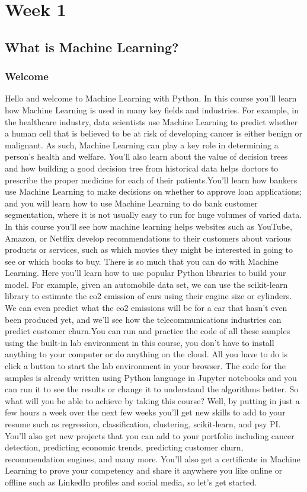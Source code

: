 \chapter{Week 1}
\section{What is Machine Learning?}
	\subsection{Welcome}
		
	Hello and welcome to Machine Learning with Python. In this course you'll learn how Machine Learning is used in many key fields and industries. For example, in the healthcare industry, data scientists use Machine Learning to predict whether a human cell that is believed to be at risk of developing cancer is either benign or malignant. As such, Machine Learning can play a key role in determining a person's health and welfare. You'll also learn about the value of decision trees and how building a good decision tree from historical data helps doctors to prescribe the proper medicine for each of their patients.You'll learn how bankers use Machine Learning to make decisions on whether to approve loan applications; and you will learn how to use Machine Learning to do bank customer segmentation, where it is not usually easy to run for huge volumes of varied data. In this course you'll see how machine learning helps websites such as YouTube, Amazon, or Netflix develop recommendations to their customers about various products or services, such as which movies they might be interested in going to see or which books to buy. There is so much that you can do with Machine Learning. Here you'll learn how to use popular Python libraries to build your model. For example, given an automobile data set, we can use the scikit-learn library to estimate the co2 emission of cars using their engine size or cylinders. We can even predict what the co2 emissions will be for a car that hasn't even been produced yet, and we'll see how the telecommunications industries can predict customer churn.You can run and practice the code of all these samples using the built-in lab environment in this course, you don't have to install anything to your computer or do anything on the cloud. All you have to do is click a button to start the lab environment in your browser. The code for the samples is already written using Python language in Jupyter notebooks and you can run it to see the results or change it to understand the algorithms better. So what will you be able to achieve by taking this course? Well, by putting in just a few hours a week over the next few weeks you'll get new skills to add to your resume such as regression, classification, clustering, scikit-learn, and psy PI. You'll also get new projects that you can add to your portfolio including cancer detection, predicting economic trends, predicting customer churn, recommendation engines, and many more. You'll also get a certificate in Machine Learning to prove your competency and share it anywhere you like online or offline such as LinkedIn profiles and social media, so let's get started. 
	

